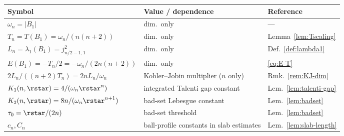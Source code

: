 \begin{center}
\renewcommand{\arraystretch}{1.25}
\begin{tabular}{|l|l|l|}\hline
Symbol & Value / dependence & Reference\\\hline
$\omega_n=|B_1|$ & dim.~only & --- \\
$T_n=T(B_1)=\omega_n/(n(n+2))$ & dim.~only & Lemma~\ref{lem:Tscaling}\\
$L_n=\lambda_1(B_1)=j_{n/2-1,1}^2$ & dim.~only & Def.~\ref{def:lambda1}\\
$E(B_1)=-T_n/2=-\omega_n/(2n(n+2))$ & dim.~only & \eqref{eq:E-T}\\
$2L_n/((n+2)T_n)=2nL_n/\omega_n$ & Kohler--Jobin multiplier ($n$ only) & Rmk.~\ref{rem:KJ-dim}\\\hline
$K_1(n,\rstar)=4/(\omega_n\rstar^n)$ & integrated Talenti gap constant & Lem.~\ref{lem:talenti-gap}\\
$K_2(n,\rstar)=8n/(\omega_n\rstar^{n+1})$ & bad-set Lebesgue constant & Lem.~\ref{lem:badset}\\
$\tau_0=\rstar/(2n)$ & bad-set threshold & Lem.~\ref{lem:badset}\\\hline
$c_n,C_n$ & ball-profile constants in slab estimates & Lem.~\ref{lem:slab-length}\\\hline
\end{tabular}
\end{center}


